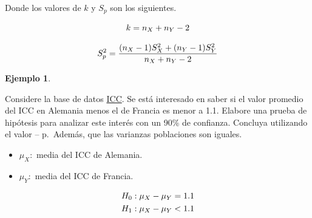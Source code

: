 \documentclass[
  11pt,
]{book}
\newenvironment{Shaded}{\begin{snugshade}}{\end{snugshade}}
\newcommand{\AttributeTok}[1]{\textcolor[rgb]{0.13,0.29,0.53}{#1}}
\newcommand{\CommentTok}[1]{\textcolor[rgb]{0.56,0.35,0.01}{\textit{#1}}}
\newcommand{\FloatTok}[1]{\textcolor[rgb]{0.00,0.00,0.81}{#1}}
\newcommand{\FunctionTok}[1]{\textcolor[rgb]{0.13,0.29,0.53}{\textbf{#1}}}
\newcommand{\NormalTok}[1]{#1}
\newcommand{\OtherTok}[1]{\textcolor[rgb]{0.56,0.35,0.01}{#1}}
\newcommand{\SpecialCharTok}[1]{\textcolor[rgb]{0.81,0.36,0.00}{\textbf{#1}}}
\newcommand{\StringTok}[1]{\textcolor[rgb]{0.31,0.60,0.02}{#1}}
\providecommand{\tightlist}{%
  \setlength{\itemsep}{0pt}\setlength{\parskip}{0pt}}
\theoremstyle{definition}
\theoremstyle{definition}
\newtheorem{example}{Ejemplo}[chapter]
\theoremstyle{definition}
\theoremstyle{definition}
\theoremstyle{remark}
\begin{document}
Donde los valores de \(k\) y \(S_p\) son los siguientes.

\begin{equation}
\notag
k = n_X + n_Y-2
\end{equation}

\begin{equation}
\notag
S_p^2 = \frac{(n_X-1)S_X^2 + (n_Y-1)S_Y^2}{n_X+n_Y-2}
\end{equation}

\begin{example}
\protect\hypertarget{exm:consumidor}{}\label{exm:consumidor}

Considere la base de datos \hyperref[ICC]{ICC}. Se está interesado en saber si el valor promedio del ICC en Alemania menos el de Francia es menor a 1.1. Elabore una prueba de hipótesis para analizar este interés con un 90\% de confianza. Concluya utilizando el valor -- p.~Además, que las varianzas poblaciones son iguales.

\begin{itemize}
\tightlist
\item
  \(\mu_X:\) media del ICC de Alemania.
\item
  \(\mu_Y:\) media del ICC de Francia.
\end{itemize}

\begin{equation}
\notag
  \begin{split}
    H_0&: \mu_{X} - \mu_{Y} = 1.1\\
    H_1&: \mu_{X} - \mu_{Y} < 1.1\\
  \end{split}
\end{equation}

\begin{Shaded}
\end{Shaded}


\end{example}
\end{document}

